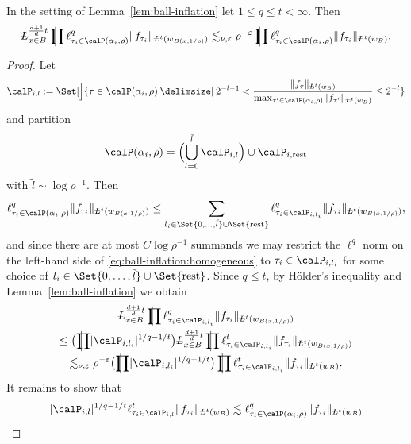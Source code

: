 \begin{corollary}
\label{cor:ball-inflation:ell-r}
In the setting of Lemma~\ref{lem:ball-inflation} let $1 \leq q \leq t < \infty$.
Then
\begin{equation}\label{eq:ball-inflation:inhomogeneous}
\avL^{\frac{d+1}{d} t}_{x \in B} \avprod \ell^{q}_{\tau_i \in \Part[\alpha_i]{\rho}} \norm{f_{\tau_i}}_{\avL^{t}(w_{B(x,1/\rho)})}
\lesssim_{\nu,\epsilon} \rho^{-\epsilon}
\avprod \ell^{q}_{\tau_i \in \Part[\alpha_i]{\rho}} \norm{f_{\tau_i}}_{\avL^{t}(w_B)}.
\end{equation}
\end{corollary}

\begin{proof}
Let
\[
\calP_{i,l} := \Set[\Big]{ \tau \in \Part[\alpha_i]{\rho} \given 2^{-l-1} < \frac{\norm{f_{\tau}}_{\avL^{t}(w_B)}}{\max_{\tau' \in \Part[\alpha_i]{\rho}} \norm{f_{\tau'}}_{\avL^{t}(w_B)}} \leq 2^{-l}}
\]
and partition
\[
\Part[\alpha_{i}]{\rho} = \Bigl( \bigcup_{l=0}^{\tilde{l}} \calP_{i,l} \Bigr) \cup \calP_{i,\mathrm{rest}}
\]
with $\tilde{l} \sim \log \rho^{-1}$.
Then
\[
\ell^{q}_{\tau_i \in \Part[\alpha_i]{\rho}} \norm{f_{\tau_i}}_{\avL^{t}(w_{B(x,1/\rho)})}
\leq
\sum_{l_{i} \in \Set{0,\dotsc,\tilde{l}} \cup \Set{\mathrm{rest}}} \ell^{q}_{\tau_i \in \calP_{i,l_{i}}} \norm{f_{\tau_i}}_{\avL^{t}(w_{B(x,1/\rho)})},
\]
and since there are at most $C \log\rho^{-1}$ summands we may restrict the $\ell^{q}$ norm on the left-hand side of \eqref{eq:ball-inflation:homogeneous} to $\tau_{i} \in \calP_{i,l_{i}}$ for some choice of $l_{i} \in \Set{0,\dotsc,\tilde{l}} \cup \Set{\mathrm{rest}}$.
Since $q \leq t$, by H\"older's inequality and Lemma~\ref{lem:ball-inflation} we obtain
\begin{multline*}
\avL^{\frac{d+1}{d} t}_{x \in B} \avprod \ell^{q}_{\tau_i \in \calP_{i,l_{i}}} \norm{f_{\tau_i}}_{\avL^{t}(w_{B(x,1/\rho)})}\\
\leq
\bigl( \avprod \abs{\calP_{i,l_{i}}}^{1/q-1/t} \bigr) \avL^{\frac{d+1}{d} t}_{x \in B} \avprod \ell^{t}_{\tau_i \in \calP_{i,l_{i}}} \norm{f_{\tau_i}}_{\avL^{t}(w_{B(x,1/\rho)})}\\
\lesssim_{\nu,\epsilon} \rho^{-\epsilon}
\bigl( \avprod \abs{\calP_{i,l_{i}}}^{1/q-1/t} \bigr)
\avprod \ell^{t}_{\tau_i \in \calP_{i,l_{i}}} \norm{f_{\tau_i}}_{\avL^{t}(w_B)}.
\end{multline*}
It remains to show that
\[
\abs{\calP_{i,l}}^{1/q-1/t}
\ell^{t}_{\tau_i \in \calP_{i,l}} \norm{f_{\tau_i}}_{\avL^{t}(w_B)}
\lesssim
\ell^{q}_{\tau_i \in \Part[\alpha_{i}]{\rho}} \norm{f_{\tau_i}}_{\avL^{t}(w_B)}
\]
\end{proof}
